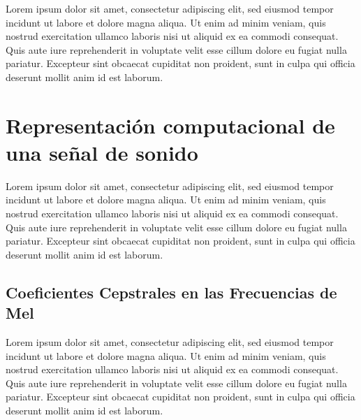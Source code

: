 Lorem ipsum dolor sit amet, consectetur adipiscing elit, sed eiusmod tempor incidunt ut labore et dolore magna aliqua.
Ut enim ad minim veniam, quis nostrud exercitation ullamco laboris nisi ut aliquid ex ea commodi consequat.
Quis aute iure reprehenderit in voluptate velit esse cillum dolore eu fugiat nulla pariatur.
Excepteur sint obcaecat cupiditat non proident, sunt in culpa qui officia deserunt mollit anim id est laborum.


\section{Representación computacional de una señal de sonido}\label{sec:features}

Lorem ipsum dolor sit amet, consectetur adipiscing elit, sed eiusmod tempor incidunt ut labore et dolore magna aliqua.
Ut enim ad minim veniam, quis nostrud exercitation ullamco laboris nisi ut aliquid ex ea commodi consequat.
Quis aute iure reprehenderit in voluptate velit esse cillum dolore eu fugiat nulla pariatur.
Excepteur sint obcaecat cupiditat non proident, sunt in culpa qui officia deserunt mollit anim id est laborum.

\subsection{Coeficientes Cepstrales en las Frecuencias de Mel}\label{subsec:MFCC}

Lorem ipsum dolor sit amet, consectetur adipiscing elit, sed eiusmod tempor incidunt ut labore et dolore magna aliqua.
Ut enim ad minim veniam, quis nostrud exercitation ullamco laboris nisi ut aliquid ex ea commodi consequat.
Quis aute iure reprehenderit in voluptate velit esse cillum dolore eu fugiat nulla pariatur.
Excepteur sint obcaecat cupiditat non proident, sunt in culpa qui officia deserunt mollit anim id est laborum.
